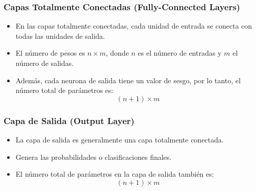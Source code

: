 \begin{frame}
    \frametitle{Capas Totalmente Conectadas (Fully-Connected Layers)}

    \begin{itemize}
        \item En las capas totalmente conectadas, cada unidad de entrada se conecta con todas las unidades de salida.
        \item El número de pesos es \( n \times m \), donde \( n \) es el número de entradas y \( m \) el número de salidas.
        \item Además, cada neurona de salida tiene un valor de sesgo, por lo tanto, el número total de parámetros es:
        \[
        (n + 1) \times m
        \]
    \end{itemize}

\end{frame}

\begin{frame}
    \frametitle{Capa de Salida (Output Layer)}

    \begin{itemize}
        \item La capa de salida es generalmente una capa totalmente conectada.
        \item Genera las probabilidades o clasificaciones finales.
        \item El número total de parámetros en la capa de salida también es:
        \[
        (n + 1) \times m
        \]
    \end{itemize}

\end{frame}


